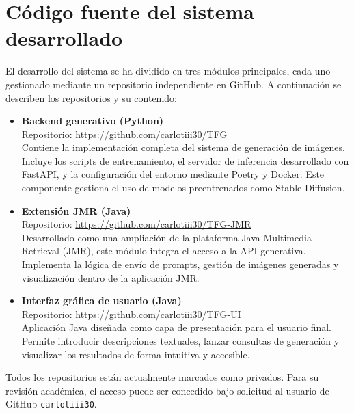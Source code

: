 \section{Código fuente del sistema desarrollado}
\label{sec:codigo-fuente}

El desarrollo del sistema se ha dividido en tres módulos principales, cada uno gestionado mediante un repositorio independiente en GitHub. A continuación se describen los repositorios y su contenido:

\begin{itemize}
    \item \textbf{Backend generativo (Python)} \\
    Repositorio: \url{https://github.com/carlotiii30/TFG} \\
    Contiene la implementación completa del sistema de generación de imágenes. Incluye los scripts de entrenamiento, el servidor de inferencia desarrollado con FastAPI, y la configuración del entorno mediante Poetry y Docker. Este componente gestiona el uso de modelos preentrenados como Stable Diffusion.

    \item \textbf{Extensión JMR (Java)} \\
    Repositorio: \url{https://github.com/carlotiii30/TFG-JMR} \\
    Desarrollado como una ampliación de la plataforma Java Multimedia Retrieval (JMR), este módulo integra el acceso a la API generativa. Implementa la lógica de envío de prompts, gestión de imágenes generadas y visualización dentro de la aplicación JMR.

    \item \textbf{Interfaz gráfica de usuario (Java)} \\
    Repositorio: \url{https://github.com/carlotiii30/TFG-UI} \\
    Aplicación Java diseñada como capa de presentación para el usuario final. Permite introducir descripciones textuales, lanzar consultas de generación y visualizar los resultados de forma intuitiva y accesible.
\end{itemize}

\noindent Todos los repositorios están actualmente marcados como privados. Para su revisión académica, el acceso puede ser concedido bajo solicitud al usuario de GitHub \texttt{carlotiii30}.
